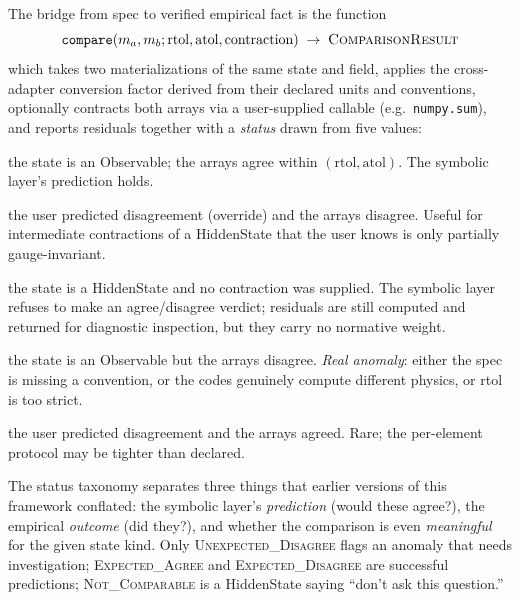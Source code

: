 \documentclass[11pt,a4paper]{article}
\begin{document}
The bridge from spec to verified empirical fact is the function
\begin{equation*}
  \texttt{compare}(m_a, m_b; \text{rtol}, \text{atol}, \text{contraction})
  \;\to\; \textsc{ComparisonResult}
\end{equation*}
which takes two materializations of the same state and field, applies the cross-adapter
conversion factor derived from their declared units and conventions, optionally
contracts both arrays via a user-supplied callable (e.g.\ \texttt{numpy.sum}), and
reports residuals together with a \emph{status} drawn from five values:
\begin{description}[leftmargin=2.5em, itemsep=0.2em]
  \item[\textsc{Expected\_Agree}] the state is an Observable; the arrays agree within
        $(\text{rtol}, \text{atol})$. The symbolic layer's prediction holds.
  \item[\textsc{Expected\_Disagree}] the user predicted disagreement (override) and the
        arrays disagree. Useful for intermediate contractions of a HiddenState that the
        user knows is only partially gauge-invariant.
  \item[\textsc{Not\_Comparable}] the state is a HiddenState and no contraction was
        supplied. The symbolic layer refuses to make an agree/disagree verdict;
        residuals are still computed and returned for diagnostic inspection, but they
        carry no normative weight.
  \item[\textsc{Unexpected\_Disagree}] the state is an Observable but the arrays
        disagree. \emph{Real anomaly}: either the spec is missing a convention, or the
        codes genuinely compute different physics, or rtol is too strict.
  \item[\textsc{Unexpected\_Agree}] the user predicted disagreement and the arrays
        agreed. Rare; the per-element protocol may be tighter than declared.
\end{description}

The status taxonomy separates three things that earlier versions of this framework
conflated: the symbolic layer's \emph{prediction} (would these agree?), the empirical
\emph{outcome} (did they?), and whether the comparison is even \emph{meaningful} for
the given state kind. Only \textsc{Unexpected\_Disagree} flags an anomaly that needs
investigation; \textsc{Expected\_Agree} and \textsc{Expected\_Disagree} are successful
predictions; \textsc{Not\_Comparable} is a HiddenState saying ``don't ask this
question.''
\end{document}
